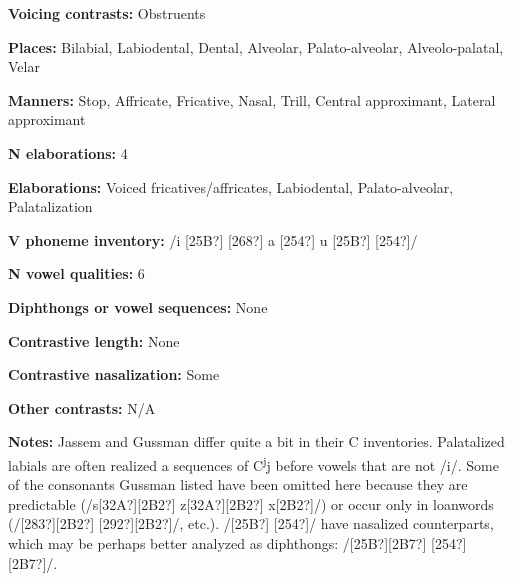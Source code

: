 \begin{styleBody}
\textbf{Voicing contrasts:} Obstruents
\end{styleBody}

\begin{styleBody}
\textbf{Places:} Bilabial, Labiodental, Dental, Alveolar, Palato-alveolar, Alveolo-palatal, Velar
\end{styleBody}

\begin{styleBody}
\textbf{Manners:} Stop, Affricate, Fricative, Nasal, Trill, Central approximant, Lateral approximant
\end{styleBody}

\begin{styleBody}
\textbf{N elaborations:} 4
\end{styleBody}

\begin{styleBody}
\textbf{Elaborations:} Voiced fricatives/affricates, Labiodental, Palato-alveolar, Palatalization
\end{styleBody}

\begin{styleBody}
\textbf{V phoneme inventory:} /i [25B?] [268?] a [254?] u [25B?] [254?]/
\end{styleBody}

\begin{styleBody}
\textbf{N vowel qualities:} 6
\end{styleBody}

\begin{styleBody}
\textbf{Diphthongs or vowel sequences:} None
\end{styleBody}

\begin{styleBody}
\textbf{Contrastive length:} None
\end{styleBody}

\begin{styleBody}
\textbf{Contrastive nasalization:} Some
\end{styleBody}

\begin{styleBody}
\textbf{Other contrasts:} N/A
\end{styleBody}

\begin{styleBody}
\textbf{Notes:} Jassem and Gussman differ quite a bit in their C inventories. Palatalized labials are often realized a sequences of C\textsuperscript{j}j before vowels that are not /i/. Some of the consonants Gussman listed have been omitted here because they are predictable (/s[32A?][2B2?] z[32A?][2B2?] x[2B2?]/) or occur only in loanwords (/[283?][2B2?] [292?][2B2?]/, etc.). /[25B?] [254?]/ have nasalized counterparts, which may be perhaps better analyzed as diphthongs: /[25B?][2B7?] [254?][2B7?]/.
\end{styleBody}

